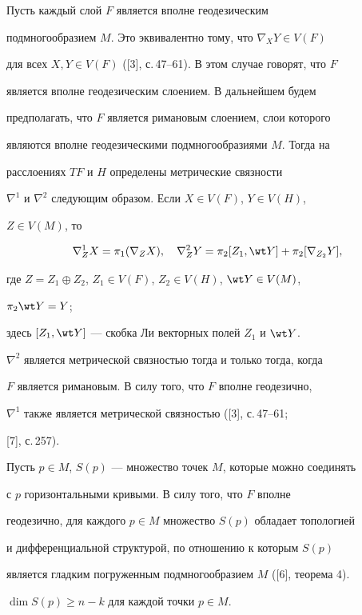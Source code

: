 Пусть каждый слой $F$ является вполне геодезическим 


подмногообразием $M$. Это эквивалентно тому, что $\nabla_XY\in V(F)$ 


для всех $X,Y\in V(F)$ ([3], с.\,47--61). В этом случае говорят, что $F$ 


является вполне геодезическим слоением. В дальнейшем будем 


предполагать, что $F$ является римановым слоением, слои которого 


являются вполне геодезическими подмногообразиями $M$. Тогда на 


расслоениях $TF$ и $H$ определены метрические связности 


$\nabla^1$ и $\nabla^2$ следующим образом. Если $X\in V(F)$, $Y\in V(H)$, 


$Z\in V(M)$, то


$$


\nabla_Z^1X=\pi_1(\nabla_ZX),\quad \nabla_Z^2Y=\pi_2[Z_1, \wt Y] + 


\pi_2[\nabla_{Z_2}Y],


$$


где $Z=Z_1\oplus Z_2$, $Z_1 \in V(F)$, $Z_2 \in V(H)$, $\wt Y \in V(M)$,


$\pi_2\wt Y=Y$;


здесь $[Z_1, \wt Y]$ --- скобка Ли векторных полей $Z_1$ и $\wt Y$.\;


$\nabla^2$ является метрической связностью тогда и только тогда, когда 


$F$ является римановым. В силу того, что $F$ вполне геодезично, 


$\nabla^1$ также является метрической связностью ([3], с.\,47--61;


[7], с.\,257).





Пусть $p\in M$, $S(p)$ --- множество точек $M$, которые можно соединять 


с $p$ горизонтальными кривыми. В силу того, что $F$ вполне 


геодезично, для каждого $p\in M$ множество $S(p)$ обладает топологией 


и дифференциальной структурой, по отношению к которым $S(p)$ 


является гладким погруженным подмногообразием $M$ ([6], теорема 4).





\begin{lem}


$\dim S(p)\ge n-k$ для каждой точки $p\in M$.


\end{lem}





